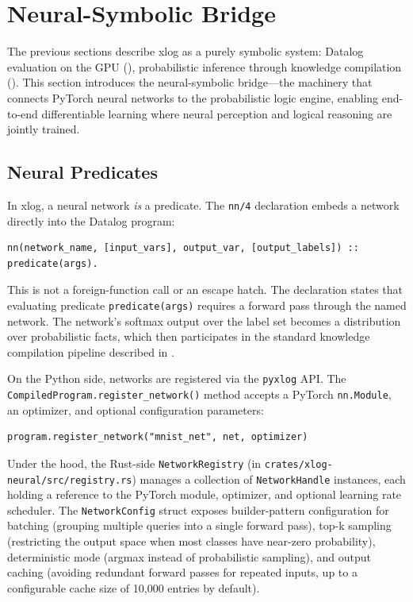 \section{Neural-Symbolic Bridge}\label{sec:nesy}

The previous sections describe xlog as a purely symbolic system: Datalog evaluation on the GPU (), probabilistic inference through knowledge compilation (). This section introduces the neural-symbolic bridge---the machinery that connects PyTorch neural networks to the probabilistic logic engine, enabling end-to-end differentiable learning where neural perception and logical reasoning are jointly trained.

\subsection{Neural Predicates}

In xlog, a neural network \emph{is} a predicate. The \texttt{nn/4} declaration embeds a network directly into the Datalog program:

\begin{lstlisting}[style=xlogstyle]
nn(network_name, [input_vars], output_var, [output_labels]) :: predicate(args).
\end{lstlisting}

This is not a foreign-function call or an escape hatch. The declaration states that evaluating predicate \texttt{predicate(args)} requires a forward pass through the named network. The network's softmax output over the label set becomes a distribution over probabilistic facts, which then participates in the standard knowledge compilation pipeline described in .

On the Python side, networks are registered via the \texttt{pyxlog} API. The \texttt{CompiledProgram.register\_network()} method accepts a PyTorch \texttt{nn.Module}, an optimizer, and optional configuration parameters:

\begin{lstlisting}[style=pythonstyle]
program.register_network("mnist_net", net, optimizer)
\end{lstlisting}

Under the hood, the Rust-side \texttt{NetworkRegistry} (in \texttt{crates/xlog-neural/src/registry.rs}) manages a collection of \texttt{NetworkHandle} instances, each holding a reference to the PyTorch module, optimizer, and optional learning rate scheduler. The \texttt{NetworkConfig} struct exposes builder-pattern configuration for batching (grouping multiple queries into a single forward pass), top-k sampling (restricting the output space when most classes have near-zero probability), deterministic mode (argmax instead of probabilistic sampling), and output caching (avoiding redundant forward passes for repeated inputs, up to a configurable cache size of 10{,}000 entries by default).

